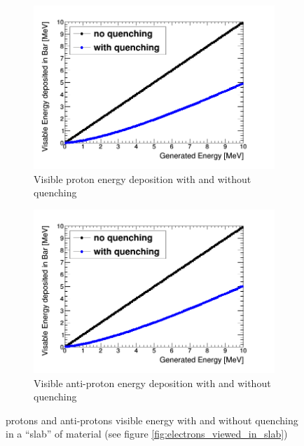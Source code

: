 \begin{figure}[htbp]
\centering
\begin{subfigure}{.5\textwidth}
  \centering
  \includegraphics[width=\linewidth]{quench_eng_protons.png}
  \captionsetup{width=.9\linewidth}
  \caption{Visible proton energy deposition with and without quenching}
  \label{subFig:proton_quenched_and_not}
\end{subfigure}%
\begin{subfigure}{.5\textwidth}
  \centering
  \includegraphics[width=\linewidth]{quench_eng_Aprotons.png}
  \captionsetup{width=.9\linewidth}
  \caption{Visible anti-proton energy deposition with and without quenching}
  \label{subFig:Aproton_quenched_and_not}
\end{subfigure}
\caption{protons and anti-protons visible energy with and without quenching in a ``slab'' of material (see figure \ref{fig:electrons_viewed_in_slab})}
\label{fig:proton_Apronton_quenched_and_not}
\end{figure}

